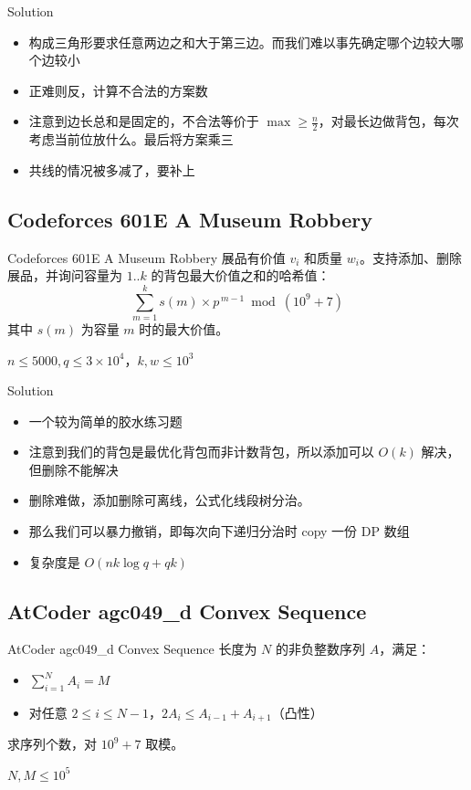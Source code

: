 ﻿\documentclass[aspectratio=169]{ctexbeamer}
\begin{document}
\begin{frame}{Solution}
    \begin{itemize}
        \item 构成三角形要求任意两边之和大于第三边。而我们难以事先确定哪个边较大哪个边较小
        \item 正难则反，计算不合法的方案数
        \item 注意到边长总和是固定的，不合法等价于 $\max \ge \frac{n}{2}$，对最长边做背包，每次考虑当前位放什么。最后将方案乘三
        \item 共线的情况被多减了，要补上
    \end{itemize}
\end{frame}







\subsection{Codeforces 601E A Museum Robbery}
\begin{frame}{Codeforces 601E A Museum Robbery}
    展品有价值 $v_i$ 和质量 $w_i$。支持添加、删除展品，并询问容量为 $1..k$ 的背包最大价值之和的哈希值：
    $$\sum_{m=1}^k s(m)\times p^{\,m-1}\bmod (10^9+7)$$
    其中 $s(m)$ 为容量 $m$ 时的最大价值。
    
    $n\le 5000,q\le 3\times10^4$，$k,w\le 10^3$
\end{frame}

\begin{frame}{Solution}
    \begin{itemize}
        \item 一个较为简单的胶水练习题
        \item 注意到我们的背包是最优化背包而非计数背包，所以添加可以 $O(k)$ 解决，但删除不能解决
        \item 删除难做，添加删除可离线，公式化线段树分治。
        \item 那么我们可以暴力撤销，即每次向下递归分治时 copy 一份 DP 数组
        \item 复杂度是 $O(nk\log q+qk)$
    \end{itemize}
\end{frame}






\subsection{AtCoder agc049\_d Convex Sequence}
\begin{frame}{AtCoder agc049\_d Convex Sequence}
    长度为 $N$ 的非负整数序列 $A$，满足：
    \begin{itemize}
        \item $\displaystyle\sum_{i=1}^N A_i = M$
        \item 对任意 $2\le i\le N-1$，$2A_i \le A_{i-1}+A_{i+1}$（凸性）
    \end{itemize}
    求序列个数，对 $10^9+7$ 取模。
    
    $N,M\le 10^5$
\end{frame}
\end{document}
